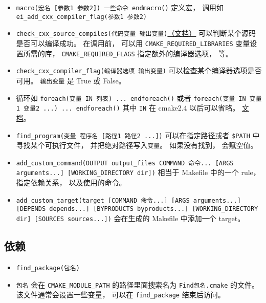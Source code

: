 \begin{itemize}
\item \verb|macro(宏名 [参数1 参数2]) 一些命令 endmacro()| 定义宏， 调用如 \verb|ei_add_cxx_compiler_flag(参数1 参数2)|
\item \verb|check_cxx_source_compiles(代码变量 输出变量)|\href{https://cmake.org/cmake/help/latest/module/CheckCXXSourceCompiles.html}{（文档）} 可以判断某个源码是否可以编译成功。 在调用前， 可以用 \verb|CMAKE_REQUIRED_LIBRARIES| 变量设置所需的库， \verb|CMAKE_REQUIRED_FLAGS| 指定额外的编译器选项， 等。
\item \verb|check_cxx_compiler_flag(编译器选项 输出变量)| 可以检查某个编译器选项是否可用。 \verb|输出变量| 是 True 或 False。
\item 循环如 \verb|foreach(变量 IN 列表) ... endforeach()| 或者 \verb|foreach(变量 IN 变量1 变量2 ...) ... endforeach()| 其中 \verb|IN| 在 cmake2.4 以后可以省略。 \href{https://cmake.org/cmake/help/latest/command/foreach.html}{文档}。
\item \verb|find_program(变量 程序名 [路径1 路径2 ...])| 可以在指定路径或者 \verb|$PATH| 中寻找某个可执行文件， 并把绝对路径写入\verb|变量|。 如果没有找到， 会赋空值。
\item \verb|add_custom_command(OUTPUT output_files COMMAND 命令... [ARGS arguments...] [WORKING_DIRECTORY dir])| 相当于 Makefile 中的一个 rule， 指定依赖关系， 以及使用的命令。
\item \verb|add_custom_target(target [COMMAND 命令...] [ARGS arguments...] [DEPENDS depends...] [BYPRODUCTS byproducts...] [WORKING_DIRECTORY dir] [SOURCES sources...])| 会在生成的 Makefile 中添加一个 target。
\end{itemize}

\subsection{依赖}
\begin{itemize}
\item \verb|find_package(包名)|
\item \verb|包名| 会在 \verb|CMAKE_MODULE_PATH| 的路径里面搜索名为 \verb|Find包名.cmake| 的文件。 该文件通常会设置一些变量， 可以在 \verb|find_package| 结束后访问。
\end{itemize}


